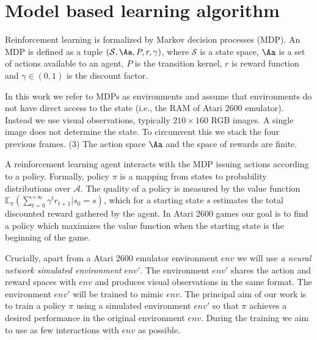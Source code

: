 \section{Model based learning algorithm}
\label{subsec:model}

Reinforcement learning is formalized by Markov decision processes (MDP). An MDP is defined as a tuple $(\mathcal{S}, \Aa, P, r, \gamma)$, where $\mathcal{S}$ is a state space, $\Aa$ is a set of actions available to an agent, $P$ is the transition kernel, $r$ is reward function and $\gamma\in (0,1)$ is the discount factor. 

In this work we refer to MDPs as environments and assume %
that environments do not have direct access to the state (i.e., the RAM of Atari 2600 emulator). Instead we use visual observations, typically $210\times 160$ RGB images. A single image does not determine the state. To circumvent this we stack the four previous frames.
(3) The action space $\Aa$ and the space of rewards are finite. 

A reinforcement learning agent interacts with the MDP issuing actions according to a policy. Formally, policy $\pi$ is a mapping from states to probability distributions over $\mathcal{A}$. The quality of a policy is measured by the value function $\mathbb{E}_{\pi}\left(\sum_{t=0}^{+\infty}\gamma^t r_{t+1}|s_0=s \right)$, which for a starting state $s$ estimates the total discounted reward gathered by the agent. In Atari 2600 games our goal is to find a policy which maximizes the value function when the starting state is the beginning of the game.

Crucially, apart from a Atari 2600 emulator environment $env$ we will use \textit{a neural network simulated environment} $env'$. The environment $env'$ shares the action and reward spaces with $env$ and produces visual observations in the same format. The  environment $env'$ will be trained to mimic $env$.  The principal aim of our work is to
train a policy $\pi$ using a simulated environment $env'$ so that $\pi$ achieves a desired performance in the original environment $env$. During the training we aim to use as few interactions with $env$ as possible. 


